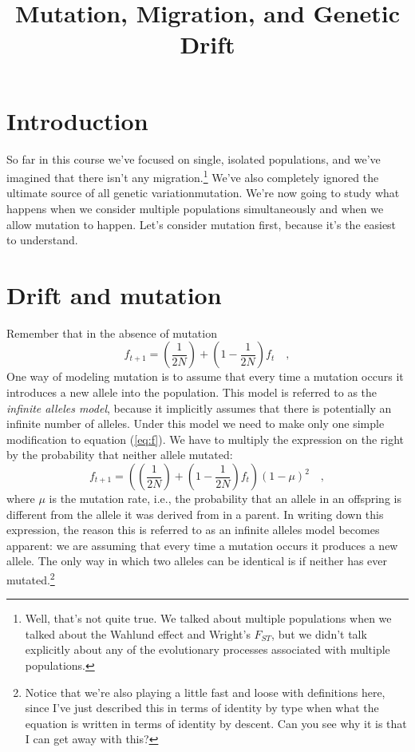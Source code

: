 \documentclass[12pt]{article}
\title{Mutation, Migration, and Genetic Drift}
\begin{document}
\maketitle

\thispagestyle{first}

\section*{Introduction}

So far in this course we've focused on single, isolated populations,
and we've imagined that there isn't any migration.\footnote{Well,
  that's not quite true. We talked about multiple populations when we
  talked about the Wahlund effect and Wright's $F_{ST}$, but we didn't
  talk explicitly about any of the evolutionary processes associated
  with multiple populations.}  We've also completely ignored the
ultimate source of all genetic variation{\dash}mutation. We're now
going to study what happens when we consider multiple populations
simultaneously and when we allow mutation to happen. Let's consider
mutation first, because it's the easiest to understand.

\section*{Drift and mutation}

Remember that in the absence of mutation
\begin{equation}
f_{t+1} = \left(\frac{1}{2N}\right) +
          \left(1 - \frac{1}{2N}\right)f_t \quad \label{eq:f} ,
\end{equation}
One way of modeling mutation is to assume that every time a mutation
occurs it introduces a new allele into the population. This model is
referred to as the {\it infinite alleles model}, because it implicitly
assumes that there is potentially an infinite number of
alleles. Under this model we
need to make only one simple modification to equation (\ref{eq:f}). We
have to multiply the expression on the right by the probability that
neither allele mutated:
\begin{equation}
f_{t+1} = \left(\left(\frac{1}{2N}\right) +
          \left(1 - \frac{1}{2N}\right)f_t\right)(1-\mu)^2 \quad
\label{eq:f-mu} ,
\end{equation}
where $\mu$ is the mutation rate, i.e., the probability that an allele
in an offspring is different from the allele it was derived from in a
parent. In writing down this expression, the reason this is referred
to as an infinite alleles model becomes apparent: we are assuming that
every time a mutation occurs it produces a new allele. The only way in
which two alleles can be identical is if neither has ever
mutated.\footnote{Notice that we're also playing a little fast and
  loose with definitions here, since I've just described this in terms
  of identity by type when what the equation is written in terms of
  identity by descent. Can you see why it is that I can get away with
  this?}
\end{document}
